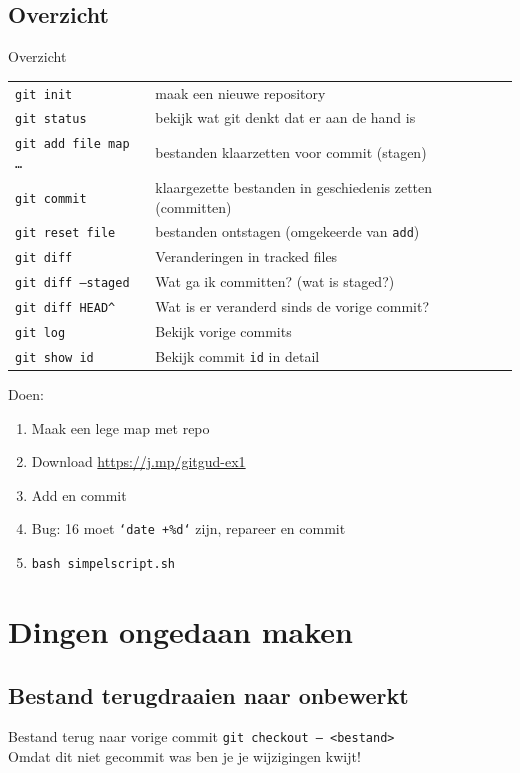 \subsection{Overzicht}
\begin{frame}{Overzicht}
	{ \footnotesize
	\begin{tabular}{ll}
		\texttt{git init}					& maak een nieuwe repository \\
		\texttt{git status} 				& bekijk wat git denkt dat er aan de hand is \\
		\texttt{git add file map \ldots}	& bestanden klaarzetten voor commit (stagen)	\\
		\texttt{git commit} 				& klaargezette bestanden in geschiedenis zetten (committen)\\
		\texttt{git reset file}		    	& bestanden ontstagen (omgekeerde van \texttt{add})	\\
		\hline
		\texttt{git diff}					& Veranderingen in tracked files					\\
		\texttt{git diff --staged}			& Wat ga ik committen? (wat is staged?)				\\
		\texttt{git diff HEAD\^}			& Wat is er veranderd sinds de vorige commit?		\\
		\hline
		\texttt{git log}					& Bekijk vorige commits								\\
		\texttt{git show id}				& Bekijk commit \texttt{id} in detail
	\end{tabular}
	}
	Doen:
	\begin{enumerate}
		\item Maak een lege map met repo
		\item Download \url{https://j.mp/gitgud-ex1}
		\item Add en commit
		\item Bug: 16 moet \texttt{`date +\%d`} zijn, repareer en commit
		\item \texttt{bash simpelscript.sh}
	\end{enumerate}
\end{frame}

\section[Ongedaan]{Dingen ongedaan maken}

\subsection{Bestand terugdraaien naar onbewerkt}
\begin{frame}{Bestand terug naar vorige commit}
	\texttt{git checkout -- <bestand>} \\
	\alert{Omdat dit niet gecommit was ben je je wijzigingen kwijt!}
\end{frame}

